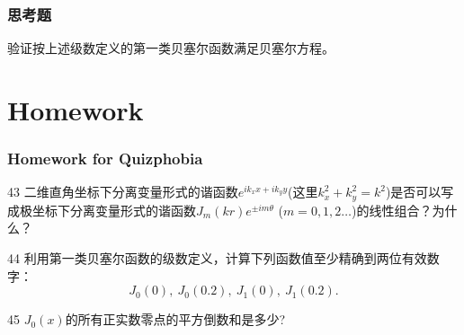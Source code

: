 \documentclass[CJK]{beamer}
\begin{document}
\begin{frame}
  \frametitle{思考题}
  

  
  验证按上述级数定义的第一类贝塞尔函数满足贝塞尔方程。
  
\end{frame}


\section{Homework}

\begin{frame}
  \frametitle{Homework for Quizphobia}
  
  \bitem
\item[43]{二维直角坐标下分离变量形式的谐函数$e^{ik_xx+ik_yy}$(这里$k_x^2+k_y^2=k^2$)是否可以写成极坐标下分离变量形式的谐函数$J_m(kr)e^{\pm im\theta}$ ($m=0,1,2\ldots$)的线性组合？为什么？}  
\item[44]{利用第一类贝塞尔函数的级数定义，计算下列函数值至少精确到两位有效数字：  $$J_0(0),\ J_0(0.2),\ J_1(0),\ J_1(0.2).$$}
\item[45]{$J_0(x)$的所有正实数零点的平方倒数和是多少?}  
  \eitem
  
\end{frame}

\ech
\end{document}
